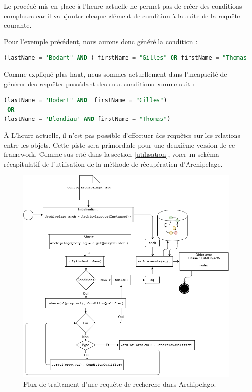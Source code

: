 \documentclass[a4paper,fleqn,12pt,oneside]{book}
\begin{document}
Le procédé mis en place à l'heure actuelle ne permet pas de créer des conditions complexes car il va ajouter chaque élément de condition à la suite de la requête courante. 

Pour l'exemple précédent, nous aurons donc généré la condition : 

\begin{lstlisting}[language=SQL]
(lastName = "Bodart" AND ( firstName = "Gilles" OR firstName = "Thomas"))
\end{lstlisting}

Comme expliqué plus haut, nous sommes actuellement dans l'incapacité de générer des requêtes possédant des sous-conditions comme suit :

\begin{lstlisting}[language=SQL]
(lastName = "Bodart" AND  firstName = "Gilles") 
 OR 
(lastName = "Blondiau" AND firstName = "Thomas")
\end{lstlisting}
\label{badCondition}
\`A L'heure actuelle, il n'est pas possible d'effectuer des requêtes sur les relations entre les objets. Cette piste sera primordiale pour une deuxième version de ce framework.
\newpage
Comme sus-cité dans la section \ref{utilisation}, voici un schéma récapitulatif de l'utilisation de la méthode de récupération d'Archipelago.
\begin{figure}[!ht]
\centering
\includegraphics[scale=0.6]{figures/query.png}
\caption{Flux de traitement d'une requête de recherche dans Archipelago.}
\label{fig:Query}
\end{figure}
\end{document}
